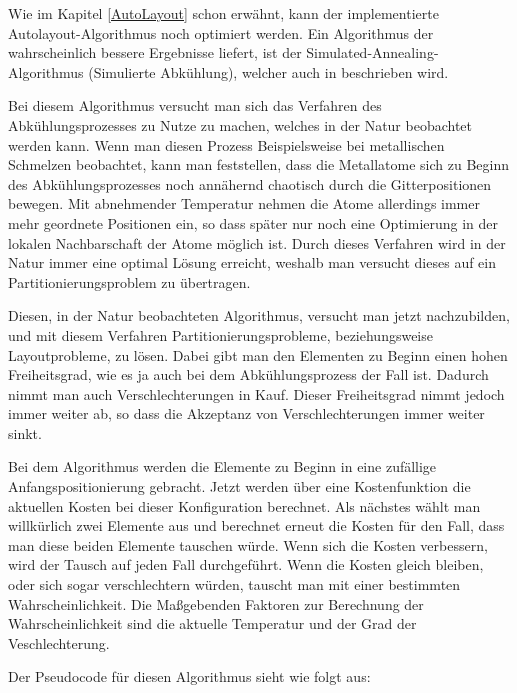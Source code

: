 Wie im Kapitel \ref{AutoLayout} schon erwähnt, kann der implementierte
Autolayout-Algorithmus noch optimiert werden. Ein Algorithmus der wahrscheinlich
bessere Ergebnisse liefert, ist der Simulated-Annealing-Algorithmus (Simulierte
Abkühlung), welcher auch in \cite{Layout} beschrieben wird.\vspace{10pt}

Bei diesem Algorithmus versucht man sich das Verfahren des Ab\-kühlungs\-pro\-zes\-ses zu
Nutze zu machen, welches in der Natur beobachtet werden kann. Wenn man diesen
Prozess Beispielsweise bei metallischen Schmelzen beobachtet, kann man
feststellen, dass die Metallatome sich zu Beginn des Ab\-kühlungs\-pro\-zes\-ses noch
annähernd chaotisch durch die Gitterpositionen bewegen. Mit abnehmender
Temperatur nehmen die Atome allerdings immer mehr geordnete Positionen ein, so
dass später nur noch eine Optimierung in der lokalen Nachbarschaft der Atome
möglich ist. Durch dieses Verfahren wird in der Natur immer eine
optimal Lösung erreicht, weshalb man versucht dieses auf ein
Partitionierungsproblem zu übertragen.\vspace{10pt}

Diesen, in der Natur beobachteten Algorithmus, versucht man jetzt nachzubilden,
und mit diesem Verfahren Partitionierungsprobleme, beziehungsweise
Layoutprobleme, zu lösen. Dabei gibt man den Elementen zu Beginn einen hohen
Freiheitsgrad, wie es ja auch bei dem Abkühlungsprozess der Fall ist. Dadurch
nimmt man auch Verschlechterungen in Kauf. Dieser Freiheitsgrad nimmt jedoch
immer weiter ab, so dass die Akzeptanz von Verschlechterungen immer weiter
sinkt.\vspace{10pt}

Bei dem Algorithmus werden die Elemente zu Beginn in eine zufällige
Anfangspositionierung gebracht. Jetzt werden über eine Kostenfunktion die
aktuellen Kosten bei dieser Konfiguration berechnet. Als nächstes wählt man
willkürlich zwei Elemente aus und berechnet erneut die Kosten für den Fall,
dass man diese beiden Elemente tauschen würde. Wenn sich die Kosten verbessern,
wird der Tausch auf jeden Fall durchgeführt. Wenn die Kosten gleich bleiben,
oder sich sogar verschlechtern würden, tauscht man mit einer bestimmten
Wahr\-schein\-lich\-keit. Die Maßgebenden Faktoren zur Berechnung der
Wahr\-schein\-lich\-keit sind die aktuelle Temperatur und der Grad der
Veschlechterung.\vspace{10pt}

\noindent
Der Pseudocode für diesen Algorithmus sieht wie folgt aus:\vspace{10pt}


